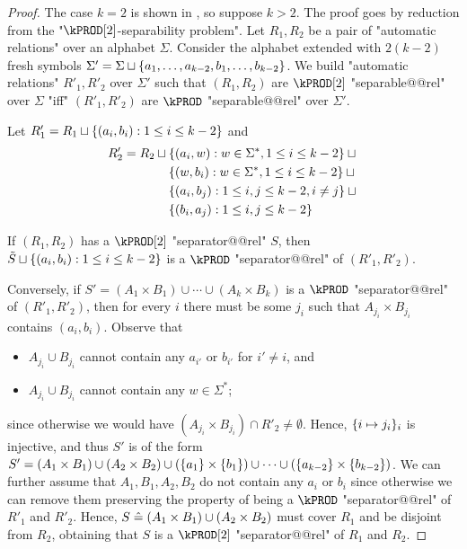 \begin{proof}
    The case $k=2$ is shown in , so suppose $k>2$.
    The proof goes by reduction from the "$\kPROD[2]$-separability problem". Let $R_1,R_2$ be a pair of "automatic relations" over an alphabet $\Sigma$. Consider the alphabet extended with $2(k-2)$ fresh symbols $\Sigma' = \Sigma \sqcup \{a_1, \dotsc, a_{k-2}, b_1, \dotsc, b_{k-2}\}$. We build "automatic relations" $R'_1,R'_2$ over $\Sigma'$ such that $(R_1,R_2)$ are $\kPROD[2]$ "separable@@rel" over $\Sigma$ "iff" $(R'_1,R'_2)$ are $\kPROD$ "separable@@rel" over $\Sigma'$.

    Let $R'_1 = R_1 \sqcup \{ (a_i,b_i) : 1 \leq i \leq k-2\}$ and 
    \begin{align*}
    R'_2 =  R_2 \sqcup {}&\{(a_i,w) : w \in \Sigma^*, 1 \leq i \leq k-2\} \sqcup {}\\
                    &\{(w,b_i) : w \in \Sigma^*, 1 \leq i \leq k-2\} \sqcup {}\\
                    &\{(a_i,b_j) : 1 \leq i,j \leq k-2, i \neq j\} \sqcup {}\\
                    &\{(b_i,a_j) : 1 \leq i,j \leq k-2\}
    \end{align*}
    
    If $(R_1,R_2)$ has a $\kPROD[2]$ "separator@@rel" $S$, then $\tilde S \sqcup \{(a_i,b_i) : 1 \leq i \leq k-2\}$ is a $\kPROD$ "separator@@rel" of $(R'_1,R'_2)$.
    

    Conversely, if $S' = (A_1 \times B_1) \cup \dotsb \cup (A_k \times B_k)$ is a $\kPROD$ "separator@@rel" of $(R'_1,R'_2)$, then for every $i$ there must be some $j_i$ such that $A_{j_i} \times B_{j_i}$ contains $(a_i,b_i)$. Observe that 
    \begin{itemize}
        \item $A_{j_i} \cup B_{j_i}$ cannot contain any $a_{i'}$ or $b_{i'}$ for $i' \neq i$, and
        \item $A_{j_i} \cup B_{j_i}$ cannot contain any $w \in \Sigma^*$;
    \end{itemize}
    since otherwise we would have $(A_{j_i} \times B_{j_i}) \cap R'_2 \neq \emptyset$.
    Hence, $\{i \mapsto j_i\}_i$ is injective, and thus $S'$ is of the form $S' = (A_1 \times B_1) \cup (A_2 \times B_2)  \cup (\{a_1\} \times \{b_1\}) \cup \dotsb \cup (\{a_{k-2}\} \times \{b_{k-2}\})$. We can further assume that $A_1,B_1,A_2,B_2$ do not contain any $a_i$ or $b_i$ since otherwise we can remove them preserving the property of being a $\kPROD$ "separator@@rel" of $R'_1$ and $R'_2$.
    Hence, $S \mathrel{\hat{=}} (A_1 \times B_1) \cup (A_2 \times B_2)$ must cover $R_1$ and be disjoint from $R_2$, obtaining that $S$ is a $\kPROD[2]$ "separator@@rel" of $R_1$ and $R_2$.
\end{proof}


